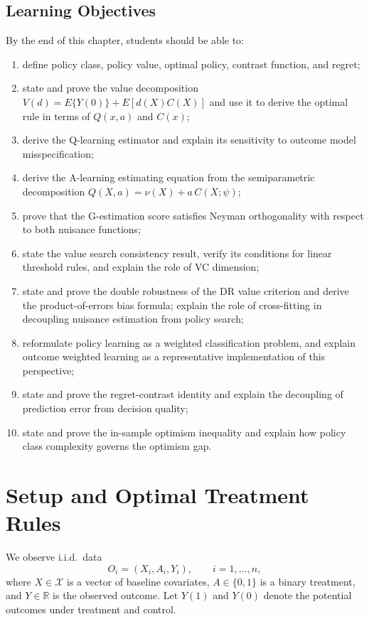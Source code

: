 \documentclass[master.tex]{subfiles}
\begin{document}
\subsection*{Learning Objectives}
By the end of this chapter, students should be able to:
\begin{enumerate}
    \item define policy class, policy value, optimal policy, contrast function, and regret;
    \item state and prove the value decomposition \(V(d)=E\{Y(0)\}+E[d(X)C(X)]\)
          and use it to derive the optimal rule in terms of \(Q(x,a)\) and \(C(x)\);
    \item derive the Q-learning estimator and explain its sensitivity to
          outcome model misspecification;
    \item derive the A-learning estimating equation from the semiparametric
          decomposition \(Q(X,a)=\nu(X)+a\,C(X;\psi)\);
    \item prove that the G-estimation score satisfies Neyman orthogonality
          with respect to both nuisance functions;
    \item state the value search consistency result, verify its conditions
          for linear threshold rules, and explain the role of VC dimension;
    \item state and prove the double robustness of the DR value criterion and
          derive the product-of-errors bias formula; explain the role of
          cross-fitting in decoupling nuisance estimation from policy search;
    \item reformulate policy learning as a weighted classification problem,
          and explain outcome weighted learning as a representative
          implementation of this perspective;
    \item state and prove the regret-contrast identity and explain the
          decoupling of prediction error from decision quality;
    \item state and prove the in-sample optimism inequality and explain how
          policy class complexity governs the optimism gap.
\end{enumerate}

\section{Setup and Optimal Treatment Rules}
\label{w14:sec:setup}

We observe i.i.d.\ data
\[
O_i=(X_i,A_i,Y_i), \qquad i=1,\dots,n,
\]
where \(X\in\mathcal X\) is a vector of baseline covariates, \(A\in\{0,1\}\) is a binary treatment, and \(Y\in\mathbb R\) is the observed outcome. Let \(Y(1)\) and \(Y(0)\) denote the potential outcomes under treatment and control.
\end{document}
